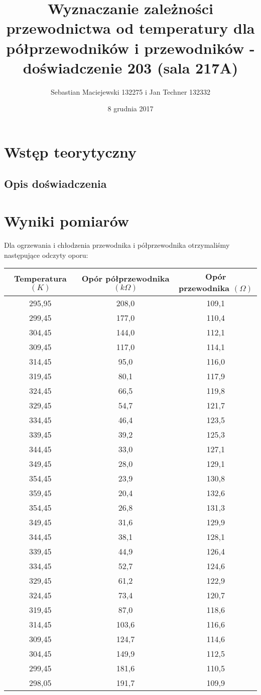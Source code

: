 \documentclass[10pt,a4paper]{article}
\author{Sebastian Maciejewski 132275 i Jan Techner 132332}
\title{Wyznaczanie zależności przewodnictwa od temperatury 
dla półprzewodników i przewodników - \\ doświadczenie 203 (sala 217A)}
\date{8 grudnia 2017}
\newcommand{\forceindent}{\leavevmode{\parindent=3em\indent}}
\begin{document}
\maketitle
\section{Wstęp teorytyczny}


\subsection*{Opis doświadczenia}

\section{Wyniki pomiarów}
\forceindent Dla ogrzewania i chłodzenia przewodnika i półprzewodnika otrzymaliśmy następujące odczyty oporu:\\
\begin{center}
\begin{tabular}{|c|c|c|}
\hline
Temperatura $(K)$ & Opór półprzewodnika $(k\Omega)$ & Opór przewodnika $(\Omega)$\\
\hline
295,95&208,0&109,1\\ 
 \hline 
299,45&177,0&110,4\\ 
 \hline 
304,45&144,0&112,1\\ 
 \hline 
309,45&117,0&114,1\\ 
 \hline 
314,45&95,0&116,0\\ 
 \hline 
319,45&80,1&117,9\\ 
 \hline 
324,45&66,5&119,8\\ 
 \hline 
329,45&54,7&121,7\\ 
 \hline 
334,45&46,4&123,5\\ 
 \hline 
339,45&39,2&125,3\\ 
 \hline 
344,45&33,0&127,1\\ 
 \hline 
349,45&28,0&129,1\\ 
 \hline 
354,45&23,9&130,8\\ 
 \hline 
359,45&20,4&132,6\\ 
 \hline 
354,45&26,8&131,3\\ 
 \hline 
349,45&31,6&129,9\\ 
 \hline 
344,45&38,1&128,1\\ 
 \hline 
339,45&44,9&126,4\\ 
 \hline 
334,45&52,7&124,6\\ 
 \hline 
329,45&61,2&122,9\\ 
 \hline 
324,45&73,4&120,7\\ 
 \hline 
319,45&87,0&118,6\\ 
 \hline 
314,45&103,6&116,6\\ 
 \hline 
309,45&124,7&114,6\\ 
 \hline 
304,45&149,9&112,5\\ 
 \hline 
299,45&181,6&110,5\\ 
 \hline 
298,05&191,7&109,9\\ 
 \hline 


\end{tabular}
\end{center}
\end{document}
